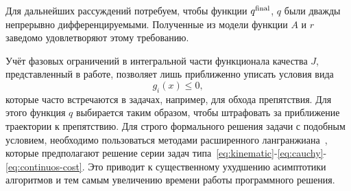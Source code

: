 \documentclass[../../doc.tex]{subfiles}
\begin{document}
    Для дальнейших рассуждений потребуем, чтобы функции $q^{\textnormal{final}}$, $q$ были дважды непрерывно дифференцируемыми.
    Полученные из модели функции $A$ и $r$ заведомо удовлетворяют этому требованию.

    \begin{remark}
        Учёт фазовых ограничений в интегральной части функционала качества $J$, представленный в работе,
        позволяет лишь приближенно уписать условия вида
        $$
            g_i(x) \leqslant 0,
        $$
        которые часто встречаются в задачах, например, для обхода препятствия.
        Для этого функция $q$ выбирается таким образом, чтобы штрафовать за приближение траектории к препятствию.
        Для строго формального решения задачи с подобным условием,
        необходимо пользоваться методами расширенного лангранжиана~\cite{birgin2009},
        которые предполагают решение серии задач типа~\eqref{eq:kinematic}-\eqref{eq:cauchy}-\eqref{eq:continuos-cost}.
        Это приводит к существенному ухудшению асимптотики алгоритмов и тем самым увеличению времени работы программного решения.
    \end{remark}

    \ifSubfilesClassLoaded{
        \nocite{*}
        \clearpage
        
        
    }{}
\end{document}
